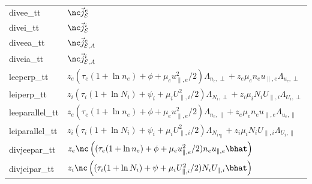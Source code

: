 \begin{longtable}{ll}
    divee\_tt &$\nc \vec j_{\mathcal E}^e$ \\
    divei\_tt &$\nc \vec j_{\mathcal E}^i$ \\
    diveea\_tt &$\nc \vec j_{\mathcal E,A}^e$\\
    diveia\_tt &$\nc \vec j_{\mathcal E,A}^i$\\
    leeperp\_tt &$z_e(\tau_e(1+\ln n_e) + \phi + \mu_eu_{\parallel,e}^2/2) \Lambda_{n_e,\perp} + z_e\mu_e n_e u_{\parallel,e} \Lambda_{u_e,\perp}$ \\
    leiperp\_tt &$z_i(\tau_i(1+\ln N_i) + \psi_i + \mu_iU_{\parallel,i}^2/2) \Lambda_{N_i,\perp} + z_i\mu_i N_i U_{\parallel,i} \Lambda_{U_i,\perp}$ \\
    leeparallel\_tt & $z_e(\tau_e(1+\ln n_e) + \phi + \mu_eu_{\parallel,e}^2/2) \Lambda_{n_e,\parallel} +
    z_e\mu_e n_e u_{\parallel,e} \Lambda_{u_e, \parallel}$ \\
    leiparallel\_tt & $z_i(\tau_i(1+\ln N_i) + \psi_i + \mu_iU_{\parallel,i}^2/2)\Lambda_{N_i,_\parallel} +
    z_i\mu_i N_i U_{\parallel,i} \Lambda_{U_i,\parallel}$ \\
    divjeepar\_tt &$ z_e\nc \left( (\tau_e(1+\ln n_e) + \phi + \mu_eu_{\parallel,e}^2/2) n_eu_{\parallel,e}\bhat\right)$ \\
    divjeipar\_tt &$ z_i\nc \left( (\tau_i(1+\ln N_i) + \psi + \mu_iU_{\parallel,i}^2/2) N_iU_{\parallel,i}\bhat\right)$ \\
\bottomrule
\end{longtable}

